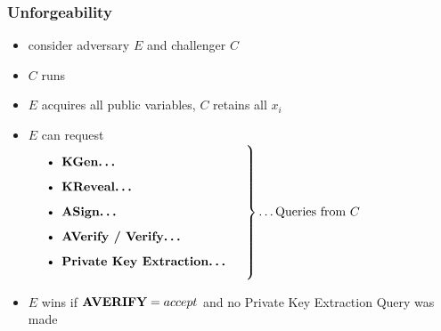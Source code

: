 \begin{frame}
	\frametitle{Unforgeability}

	\begin{itemize}
		\item consider adversary $E$ and challenger $C$
		\item $C$ runs \setup
		\item $E$ acquires all public variables, $C$ retains all $x_i$
		\item $E$ can request\\[.2cm]
			$\left.\parbox{.5\textwidth}{%
			\begin{itemize}
				\item \textbf{KGen\ldots}
				\item \textbf{KReveal\ldots}
				\item \textbf{ASign\ldots} 
				\item \textbf{AVerify / Verify\ldots}
				\item \textbf{Private Key Extraction\ldots}
			\end{itemize}%
			}\right\}\text{\ldots Queries from } C$
		\item $E$ wins if \textcolor{blue}{$\textbf{AVERIFY} = accept$} and no Private Key Extraction Query was made
		\end{itemize}
\end{frame}